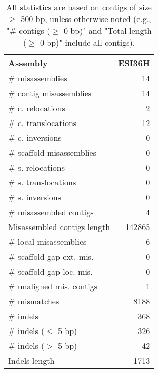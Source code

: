 \documentclass[12pt,a4paper]{article}
\begin{document}
\begin{table}[ht]
\begin{center}
\caption{All statistics are based on contigs of size $\geq$ 500 bp, unless otherwise noted (e.g., "\# contigs ($\geq$ 0 bp)" and "Total length ($\geq$ 0 bp)" include all contigs).}
\begin{tabular}{|l*{1}{|r}|}
\hline
Assembly & ESI36H \\ \hline
\# misassemblies & 14 \\ \hline
\hspace{2mm}\# contig misassemblies & 14 \\ \hline
\hspace{5mm}\# c. relocations & 2 \\ \hline
\hspace{5mm}\# c. translocations & 12 \\ \hline
\hspace{5mm}\# c. inversions & 0 \\ \hline
\hspace{2mm}\# scaffold misassemblies & 0 \\ \hline
\hspace{5mm}\# s. relocations & 0 \\ \hline
\hspace{5mm}\# s. translocations & 0 \\ \hline
\hspace{5mm}\# s. inversions & 0 \\ \hline
\# misassembled contigs & 4 \\ \hline
Misassembled contigs length & 142865 \\ \hline
\# local misassemblies & 6 \\ \hline
\# scaffold gap ext. mis. & 0 \\ \hline
\# scaffold gap loc. mis. & 0 \\ \hline
\# unaligned mis. contigs & 1 \\ \hline
\# mismatches & 8188 \\ \hline
\# indels & 368 \\ \hline
\hspace{5mm}\# indels ($\leq$ 5 bp) & 326 \\ \hline
\hspace{5mm}\# indels ($>$ 5 bp) & 42 \\ \hline
Indels length & 1713 \\ \hline
\end{tabular}
\end{center}
\end{table}
\end{document}
